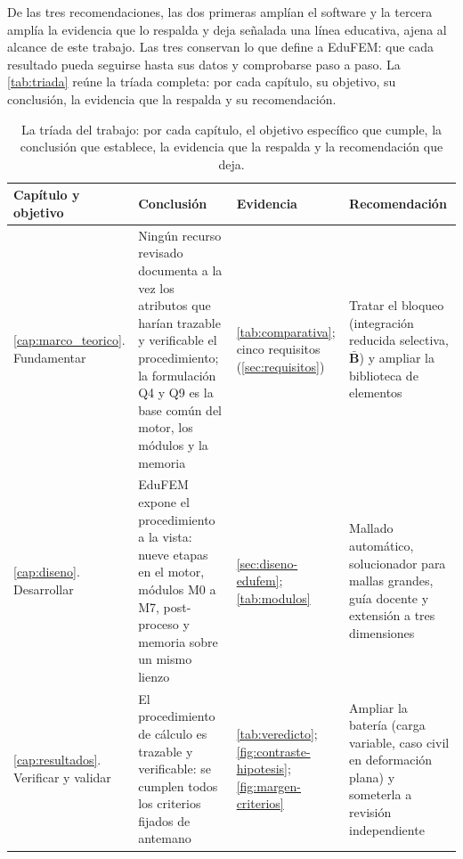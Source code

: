 De las tres recomendaciones, las dos primeras amplían el software y la tercera amplía la evidencia que lo respalda y deja señalada una línea educativa, ajena al alcance de este trabajo. Las tres conservan lo que define a EduFEM: que cada resultado pueda seguirse hasta sus datos y comprobarse paso a paso. La \autoref{tab:triada} reúne la tríada completa: por cada capítulo, su objetivo, su conclusión, la evidencia que la respalda y su recomendación.

\begin{table}[htbp]
\centering
\caption[La tríada: capítulo, conclusión y recomendación.]{La tríada del trabajo: por cada capítulo, el objetivo específico que cumple, la conclusión que establece, la evidencia que la respalda y la recomendación que deja.}
\label{tab:triada}
{\footnotesize
\setlength{\tabcolsep}{3pt}
\renewcommand{\arraystretch}{1.2}
\begin{tabular}{@{}>{\raggedright\arraybackslash}p{2.5cm}>{\raggedright\arraybackslash}p{4.6cm}>{\raggedright\arraybackslash}p{3.3cm}>{\raggedright\arraybackslash}p{4.1cm}@{}}
\toprule
\textbf{Capítulo y objetivo} & \textbf{Conclusión} & \textbf{Evidencia} & \textbf{Recomendación} \\
\midrule
\autoref{cap:marco_teorico}. Fundamentar & Ningún recurso revisado documenta a la vez los atributos que harían trazable y verificable el procedimiento; la formulación Q4 y Q9 es la base común del motor, los módulos y la memoria & \autoref{tab:comparativa}; cinco requisitos (\autoref{sec:requisitos}) & Tratar el bloqueo (integración reducida selectiva, $\bar{\bm{B}}$) y ampliar la biblioteca de elementos \\
\autoref{cap:diseno}. Desarrollar & EduFEM expone el procedimiento a la vista: nueve etapas en el motor, módulos M0 a M7, post-proceso y memoria sobre un mismo lienzo & \autoref{sec:diseno-edufem}; \autoref{tab:modulos} & Mallado automático, solucionador para mallas grandes, guía docente y extensión a tres dimensiones \\
\autoref{cap:resultados}. Verificar y validar & El procedimiento de cálculo es trazable y verificable: se cumplen todos los criterios fijados de antemano & \autoref{tab:veredicto}; \autoref{fig:contraste-hipotesis}; \autoref{fig:margen-criterios} & Ampliar la batería (carga variable, caso civil en deformación plana) y someterla a revisión independiente \\
\bottomrule
\end{tabular}}
\end{table}

\endgroup
